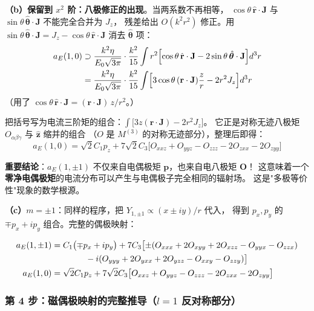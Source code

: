 \textbf{（b）保留到 $x^2$ 阶：八极修正的出现}。当两系数不再相等，
$\cos\theta\,\hat{\mathbf{r}}\cdot\mathbf{J}$ 与 $\sin\theta\,\hat{\boldsymbol{\theta}}\cdot\mathbf{J}$ 不能完全合并为 $J_z$，
残差给出 $O(k^2 r^2)$ 修正。用 $\sin\theta\,\hat{\boldsymbol{\theta}}\cdot\mathbf{J}
= J_z - \cos\theta\,\hat{\mathbf{r}}\cdot\mathbf{J}$ 消去 $\hat{\boldsymbol{\theta}}$ 项：
\begin{align}
  a_E(1,0) &\supset \frac{k^2\eta}{E_0\sqrt{3\pi}}\cdot\frac{k^2}{15}\int r^2\Bigl[
    \cos\theta\,\hat{\mathbf{r}}\cdot\mathbf{J} - 2\sin\theta\,\hat{\boldsymbol{\theta}}\cdot\mathbf{J}\Bigr]d^3r \notag\\
  &= \frac{k^2\eta}{E_0\sqrt{3\pi}}\cdot\frac{k^2}{15}\int\Bigl[
    3\cos\theta\,(\mathbf{r}\cdot\mathbf{J})\frac{z}{r} - 2r^2 J_z\Bigr]d^3r
\end{align}
（用了 $\cos\theta\,\hat{\mathbf{r}}\cdot\mathbf{J} = (\mathbf{r}\cdot\mathbf{J})\,z/r^2$。）

把括号写为电流三阶矩的组合：$\int\bigl[3z(\mathbf{r}\cdot\mathbf{J})-2r^2J_z\bigr]$。
它正是对称无迹八极矩 $O_{\alpha\beta\gamma}$ 与 $\hat{\mathbf{z}}$ 缩并的组合
（$O$ 是 $M^{(3)}$ 的对称无迹部分），整理后即得：
\begin{equation}
  a_E(1,0) = \sqrt{2}C_1 p_z
  + 7\sqrt{2}C_3\bigl[O_{xxz}+O_{yyz}-O_{zzz}-2O_{zxx}-2O_{zyy}\bigr]
\end{equation}

\begin{nontrivial}
\textbf{重要结论}：$a_E(1,\pm1)$ 不仅来自电偶极矩 $\mathbf{p}$，也来自电八极矩 $\mathbf{O}$！
这意味着一个\textbf{零净电偶极矩}的电流分布可以产生与电偶极子完全相同的辐射场。
这是"多极等价性"现象的数学根源。
\end{nontrivial}

\textbf{（c）$m=\pm1$}：同样的程序，把 $Y_{1,\pm1}\propto (x\pm iy)/r$ 代入，
得到 $p_x,p_y$ 的 $\mp p_x+ip_y$ 组合。完整的偶极映射：

\begin{align}
  a_E(1,\pm1) &= C_1\bigl(\mp p_x + ip_y\bigr)
    + 7C_3\bigl[\pm(O_{xxx}+2O_{xyy}+2O_{xzz}-O_{yyx}-O_{zzx}) \notag\\
    &\qquad\qquad - i(O_{yyy}+2O_{yxx}+2O_{yzz}-O_{xxy}-O_{zzy})\bigr] \\
  a_E(1,0) &= \sqrt{2}C_1 p_z
    + 7\sqrt{2}C_3\bigl[O_{xxz}+O_{yyz}-O_{zzz}-2O_{zxx}-2O_{zyy}\bigr]
\end{align}

\subsubsection{第 4 步：磁偶极映射的完整推导（$l=1$ 反对称部分）}

